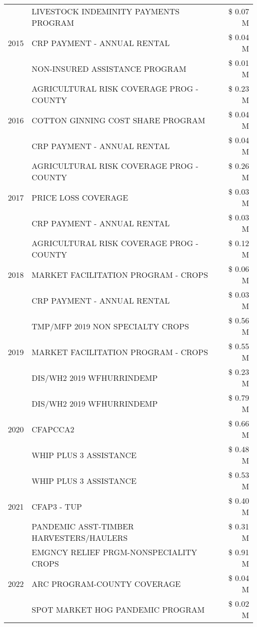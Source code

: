 \begin{tabular}{llr}
\cline{1-3}
\multirow[t]{3}{*}{2015} & LIVESTOCK INDEMINITY PAYMENTS PROGRAM & \$ 0.07 M \\
 & CRP PAYMENT - ANNUAL RENTAL & \$ 0.04 M \\
 & NON-INSURED ASSISTANCE PROGRAM & \$ 0.01 M \\
\cline{1-3}
\multirow[t]{3}{*}{2016} & AGRICULTURAL RISK COVERAGE PROG - COUNTY & \$ 0.23 M \\
 & COTTON GINNING COST SHARE PROGRAM & \$ 0.04 M \\
 & CRP PAYMENT - ANNUAL RENTAL & \$ 0.04 M \\
\cline{1-3}
\multirow[t]{3}{*}{2017} & AGRICULTURAL RISK COVERAGE PROG - COUNTY & \$ 0.26 M \\
 & PRICE LOSS COVERAGE & \$ 0.03 M \\
 & CRP PAYMENT - ANNUAL RENTAL & \$ 0.03 M \\
\cline{1-3}
\multirow[t]{3}{*}{2018} & AGRICULTURAL RISK COVERAGE PROG - COUNTY & \$ 0.12 M \\
 & MARKET FACILITATION PROGRAM - CROPS & \$ 0.06 M \\
 & CRP PAYMENT - ANNUAL RENTAL & \$ 0.03 M \\
\cline{1-3}
\multirow[t]{3}{*}{2019} & TMP/MFP 2019 NON SPECIALTY CROPS & \$ 0.56 M \\
 & MARKET FACILITATION PROGRAM - CROPS & \$ 0.55 M \\
 & DIS/WH2 2019 WFHURRINDEMP & \$ 0.23 M \\
\cline{1-3}
\multirow[t]{3}{*}{2020} & DIS/WH2 2019 WFHURRINDEMP & \$ 0.79 M \\
 & CFAPCCA2 & \$ 0.66 M \\
 & WHIP PLUS 3 ASSISTANCE & \$ 0.48 M \\
\cline{1-3}
\multirow[t]{3}{*}{2021} & WHIP PLUS 3 ASSISTANCE & \$ 0.53 M \\
 & CFAP3 - TUP & \$ 0.40 M \\
 & PANDEMIC ASST-TIMBER HARVESTERS/HAULERS & \$ 0.31 M \\
\cline{1-3}
\multirow[t]{3}{*}{2022} & EMGNCY RELIEF PRGM-NONSPECIALITY CROPS & \$ 0.91 M \\
 & ARC PROGRAM-COUNTY COVERAGE & \$ 0.04 M \\
 & SPOT MARKET HOG PANDEMIC PROGRAM & \$ 0.02 M \\
\cline{1-3}
\bottomrule
\end{tabular}
